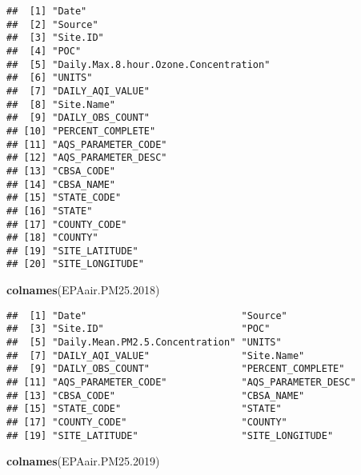 \documentclass[]{article}
\newenvironment{Shaded}{\begin{snugshade}}{\end{snugshade}}
\newcommand{\FloatTok}[1]{\textcolor[rgb]{0.00,0.00,0.81}{#1}}
\newcommand{\KeywordTok}[1]{\textcolor[rgb]{0.13,0.29,0.53}{\textbf{#1}}}
\newcommand{\NormalTok}[1]{#1}
\begin{document}
\begin{verbatim}
##  [1] "Date"                                
##  [2] "Source"                              
##  [3] "Site.ID"                             
##  [4] "POC"                                 
##  [5] "Daily.Max.8.hour.Ozone.Concentration"
##  [6] "UNITS"                               
##  [7] "DAILY_AQI_VALUE"                     
##  [8] "Site.Name"                           
##  [9] "DAILY_OBS_COUNT"                     
## [10] "PERCENT_COMPLETE"                    
## [11] "AQS_PARAMETER_CODE"                  
## [12] "AQS_PARAMETER_DESC"                  
## [13] "CBSA_CODE"                           
## [14] "CBSA_NAME"                           
## [15] "STATE_CODE"                          
## [16] "STATE"                               
## [17] "COUNTY_CODE"                         
## [18] "COUNTY"                              
## [19] "SITE_LATITUDE"                       
## [20] "SITE_LONGITUDE"
\end{verbatim}

\begin{Shaded}
\begin{Highlighting}[]
\KeywordTok{colnames}\NormalTok{(EPAair.PM25}\FloatTok{.2018}\NormalTok{)}
\end{Highlighting}
\end{Shaded}

\begin{verbatim}
##  [1] "Date"                           "Source"                        
##  [3] "Site.ID"                        "POC"                           
##  [5] "Daily.Mean.PM2.5.Concentration" "UNITS"                         
##  [7] "DAILY_AQI_VALUE"                "Site.Name"                     
##  [9] "DAILY_OBS_COUNT"                "PERCENT_COMPLETE"              
## [11] "AQS_PARAMETER_CODE"             "AQS_PARAMETER_DESC"            
## [13] "CBSA_CODE"                      "CBSA_NAME"                     
## [15] "STATE_CODE"                     "STATE"                         
## [17] "COUNTY_CODE"                    "COUNTY"                        
## [19] "SITE_LATITUDE"                  "SITE_LONGITUDE"
\end{verbatim}

\begin{Shaded}
\begin{Highlighting}[]
\KeywordTok{colnames}\NormalTok{(EPAair.PM25}\FloatTok{.2019}\NormalTok{)}
\end{Highlighting}
\end{Shaded}
\end{document}
